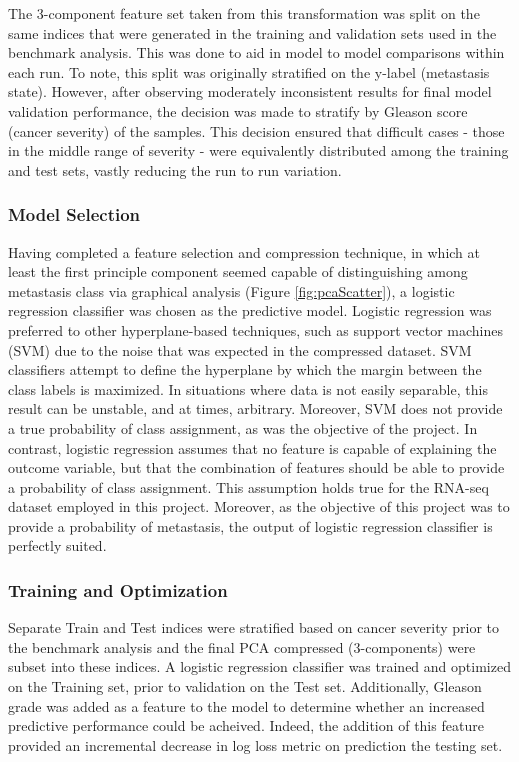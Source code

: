 \documentclass[final]{article}
\begin{document}
The 3-component feature set taken from this transformation was split on the same indices that were generated in
the training and validation sets used in the benchmark analysis.  This was done
to aid in model to model comparisons within each run.  To note, this split was
originally stratified on the y-label (metastasis state).  However, after
observing moderately inconsistent results for final model validation
performance, the decision was made to stratify by Gleason score (cancer
severity) of the samples.   This decision ensured that difficult cases - those
in the middle range of severity - were equivalently distributed among the
training and test sets, vastly reducing the run to run variation.

\subsubsection{Model Selection}

Having completed a feature selection and compression technique, in which at
least the first principle component seemed capable of distinguishing among
metastasis class via graphical analysis (Figure \ref{fig:pcaScatter}), a
logistic regression classifier was chosen as the predictive model.  Logistic
regression was preferred  to other hyperplane-based techniques, such as support
vector machines (SVM) due to the noise that was expected in the compressed
dataset. SVM classifiers attempt to define the hyperplane by which the margin
between the class labels is maximized.  In situations where data is not easily
separable, this result can be unstable, and  at times, arbitrary.  Moreover, SVM
does not provide a true probability of class assignment, as was the objective of
the project.  In contrast, logistic regression assumes that no feature  is
capable of explaining the outcome variable, but that the combination of features
should be able to provide a probability of class assignment.  This assumption
holds true for the RNA-seq dataset employed in this project.  Moreover, as the
objective of this project was to provide a probability of metastasis, the output
of logistic regression classifier is perfectly suited.

\subsubsection{Training and Optimization}

Separate Train and Test indices were stratified based on cancer severity prior
to the benchmark analysis and the final PCA compressed (3-components) were
subset into these indices.  A logistic regression classifier was trained and
optimized on the Training set, prior to validation on the Test set.  Additionally,
Gleason grade was added as a feature to the model to determine whether an increased
predictive performance could be acheived.  Indeed, the addition of this feature
provided an incremental decrease in log loss metric on prediction the testing set.
\end{document}
